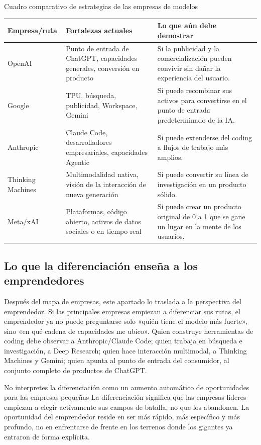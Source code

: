 \begin{knowledgebox}{Cuadro comparativo de estrategias de las empresas de modelos}
\begin{tabularx}{\textwidth}{p{}p{}p{}}
\toprule
Empresa/ruta & Fortalezas actuales & Lo que aún debe demostrar \\
\midrule
OpenAI & Punto de entrada de ChatGPT, capacidades generales, conversión en producto & Si la publicidad y la comercialización pueden convivir sin dañar la experiencia del usuario. \\
Google & TPU, búsqueda, publicidad, Workspace, Gemini & Si puede recombinar sus activos para convertirse en el punto de entrada predeterminado de la IA. \\
Anthropic & Claude Code, desarrolladores empresariales, capacidades Agentic & Si puede extenderse del coding a flujos de trabajo más amplios. \\
Thinking Machines & Multimodalidad nativa, visión de la interacción de nueva generación & Si puede convertir su línea de investigación en un producto sólido. \\
Meta/xAI & Plataformas, código abierto, activos de datos sociales o en tiempo real & Si puede crear un producto original de 0 a 1 que se gane un lugar en la mente de los usuarios. \\
\bottomrule
\end{tabularx}
\end{knowledgebox}

\subsection{Lo que la diferenciación enseña a los emprendedores}

Después del mapa de empresas, este apartado lo traslada a la perspectiva del emprendedor. Si las principales empresas empiezan a diferenciar sus rutas, el emprendedor ya no puede preguntarse solo «quién tiene el modelo más fuerte», sino «en qué cadena de capacidades me ubico». Quien construye herramientas de coding debe observar a Anthropic/Claude Code; quien trabaja en búsqueda e investigación, a Deep Research; quien hace interacción multimodal, a Thinking Machines y Gemini; quien apunta al punto de entrada del consumidor, al conjunto completo de productos de ChatGPT.

\begin{warningbox}{No interpretes la diferenciación como un aumento automático de oportunidades para las empresas pequeñas}
La diferenciación significa que las empresas líderes empiezan a elegir activamente sus campos de batalla, no que los abandonen. La oportunidad del emprendedor reside en ser más rápido, más específico y más profundo, no en enfrentarse de frente en los terrenos donde los gigantes ya entraron de forma explícita.
\end{warningbox}

